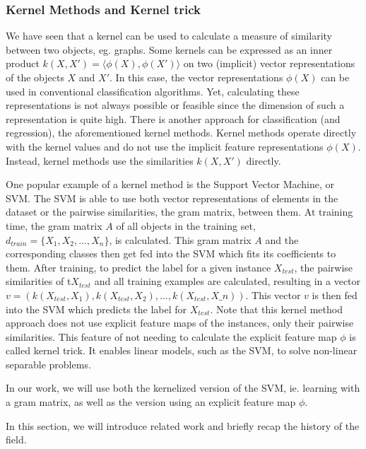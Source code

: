 \subsubsection{Kernel Methods and Kernel trick}
We have seen that a kernel can be used to calculate a measure of similarity between two objects, eg. graphs.
Some kernels can be expressed as an inner product $k(X, X') = \langle \phi(X), \phi(X') \rangle$ on two (implicit) vector representations of the objects $X$ and $X'$.
In this case, the vector representations $\phi(X)$ can be used in conventional classification algorithms.
Yet, calculating these representations is not always possible or feasible since the dimension of such a representation is quite high.
There is another approach for classification (and regression), the aforementioned kernel methods.
Kernel methods operate directly with the kernel values and do not use the implicit feature representations $\phi(X)$.
Instead, kernel methods use the similarities $k(X, X')$ directly.

One popular example of a kernel method is the Support Vector Machine, or SVM.
The SVM is able to use both vector representations of elements in the dataset or the pairwise similarities, the gram matrix, between them.
At training time, the gram matrix $A$ of all objects in the training set, $d_{train} = \{X_1, X_2, \ldots, X_n\}$, is calculated.
This gram matrix $A$ and the corresponding classes then get fed into the SVM which fits its coefficients to them.
After training, to predict the label for a given instance $X_{test}$, the pairwise similarities of t$X_{test}$ and all training examples are calculated, resulting in a vector $v = (k(X_{test}, X_1), k(X_{test}, X_2), \ldots, k(X_{test}, X\_n))$.
This vector $v$ is then fed into the SVM which predicts the label for $X_{test}$.
Note that this kernel method approach does not use explicit feature maps of the instances, only their pairwise similarities.
This feature of not needing to calculate the explicit feature map $\phi$ is called kernel trick.
It enables linear models, such as the SVM, to solve non-linear separable problems.

In our work, we will use both the kernelized version of the SVM, ie. learning with a gram matrix, as well as the version using an explicit feature map $\phi$.


In this section, we will introduce related work and briefly recap the history of the field.

